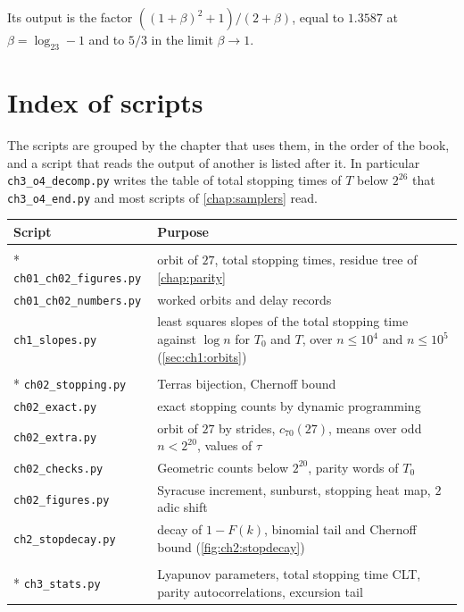 \noindent Its output is the factor $((1+\beta)^2+1)/(2+\beta)$, equal to $1.3587$
at $\beta=\log_23-1$ and to $5/3$ in the limit $\beta\to1$.

\section{Index of scripts}

The scripts are grouped by the chapter that uses them, in the order of the book, and a script that reads the output of another is listed after it.
In particular \texttt{ch3\_o4\_decomp.py} writes the table of total stopping times of $T$ below $2^{26}$ that \texttt{ch3\_o4\_end.py} and most scripts of \cref{chap:samplers} read.

{\small
\begin{longtable}{@{}l>{\raggedright\arraybackslash}p{}@{}}
\toprule
Script & Purpose \\
\midrule
\endhead
\bottomrule
\endfoot
\multicolumn{2}{@{}l}{\itshape\Cref{chap:intro}} \\*
\texttt{ch01\_ch02\_figures.py} & orbit of $27$, total stopping times, residue tree of \cref{chap:parity} \\
\texttt{ch01\_ch02\_numbers.py} & worked orbits and delay records \\
\texttt{ch1\_slopes.py} & least squares slopes of the total stopping time against $\log n$ for $T_0$ and $T$, over $n\le10^4$ and $n\le10^5$ (\cref{sec:ch1:orbits}) \\
\addlinespace[4pt]
\multicolumn{2}{@{}l}{\itshape\Cref{chap:parity}} \\*
\texttt{ch02\_stopping.py} & Terras bijection, Chernoff bound \\
\texttt{ch02\_exact.py} & exact stopping counts by dynamic programming \\
\texttt{ch02\_extra.py} & orbit of $27$ by strides, $c_{70}(27)$, means over odd $n<2^{20}$, values of $\tau$ \\
\texttt{ch02\_checks.py} & Geometric counts below $2^{20}$, parity words of $T_0$ \\
\texttt{ch02\_figures.py} & Syracuse increment, sunburst, stopping heat map, $2$ adic shift \\
\texttt{ch2\_stopdecay.py} & decay of $1-F(k)$, binomial tail and Chernoff bound (\cref{fig:ch2:stopdecay}) \\
\addlinespace[4pt]
\multicolumn{2}{@{}l}{\itshape\Cref{chap:stochastic}} \\*
\texttt{ch3\_stats.py} & Lyapunov parameters, total stopping time CLT, parity autocorrelations, excursion tail \\

\end{longtable}}
